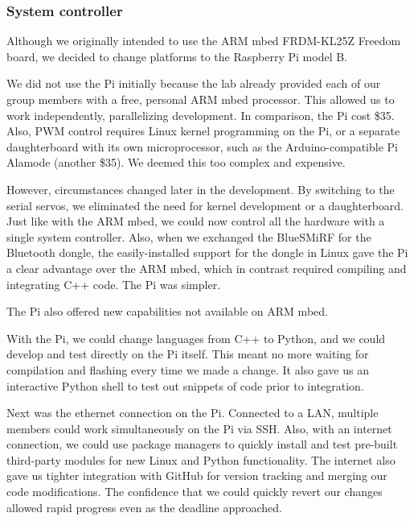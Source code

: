 \documentclass[conference, twocolumn]{IEEEtran}
\begin{document}
\subsubsection{System controller}
Although we originally intended to use the ARM mbed FRDM-KL25Z Freedom board, we decided to change platforms to the Raspberry Pi model B.

We did not use the Pi initially because the lab already provided each of our group members with a free, personal ARM mbed processor. This allowed us to work independently, parallelizing development. In comparison, the Pi cost \$35. Also, PWM control requires Linux kernel programming on the Pi, or a separate daughterboard with its own microprocessor, such as the Arduino-compatible Pi Alamode (another \$35). We deemed this too complex and expensive.

However, circumstances changed later in the development. By switching to the serial servos, we eliminated the need for kernel development or a daughterboard. Just like with the ARM mbed, we could now control all the hardware with a single system controller. Also, when we exchanged the BlueSMiRF for the Bluetooth dongle, the easily-installed support for the dongle in Linux gave the Pi a clear advantage over the ARM mbed, which in contrast required compiling and integrating C++ code. The Pi was simpler.

The Pi also offered new capabilities not available on ARM mbed. 

With the Pi, we could change languages from C++ to Python, and we could develop and test directly on the Pi itself. This meant no more waiting for compilation and flashing every time we made a change. It also gave us an interactive Python shell to test out snippets of code prior to integration. 

Next was the ethernet connection on the Pi. Connected to a LAN, multiple members could work simultaneously on the Pi via SSH. Also, with an internet connection, we could use package managers to quickly install and test pre-built third-party modules for new Linux and Python functionality. The internet also gave us tighter integration with GitHub for version tracking and merging our code modifications. The confidence that we could quickly revert our changes allowed rapid progress even as the deadline approached.
\end{document}
